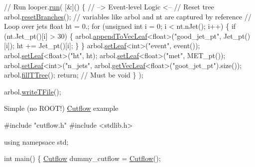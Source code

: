 \begin{DoxyEnumerate}
\begin{DoxyCode}
\textcolor{comment}{// Run}
looper.\hyperlink{classLooper_abfa564ca48778da1f58c8a6444ddd463}{run}(
    [&]()
    \{
        \textcolor{comment}{// --> Event-level Logic <--}
        \textcolor{comment}{// Reset tree}
        arbol.\hyperlink{classArbol_a4c2184d378ab21a9627a57098291a7c4}{resetBranches}(); \textcolor{comment}{// variables like arbol and nt are captured by reference}
        \textcolor{comment}{// Loop over jets}
        \textcolor{keywordtype}{float} ht = 0.;
        \textcolor{keywordflow}{for} (\textcolor{keywordtype}{unsigned} \textcolor{keywordtype}{int} i = 0; i < nt.nJet(); i++) 
        \{
            \textcolor{keywordflow}{if} (nt.Jet\_pt()[i] > 30)
            \{
                arbol.\hyperlink{classArbol_a811156c9134ca7e0015bbe2ab95434b0}{appendToVecLeaf}<\textcolor{keywordtype}{float}>(\textcolor{stringliteral}{"good\_jet\_pt"}, Jet\_pt()[i]);
                ht += Jet\_pt()[i];
            \}
        \}
        arbol.\hyperlink{classArbol_a7a8d3bec0bf5c00635a0b00fcd63cf01}{setLeaf}<\textcolor{keywordtype}{int}>(\textcolor{stringliteral}{"event"}, event());
        arbol.\hyperlink{classArbol_a7a8d3bec0bf5c00635a0b00fcd63cf01}{setLeaf}<\textcolor{keywordtype}{float}>(\textcolor{stringliteral}{"ht"}, ht);
        arbol.\hyperlink{classArbol_a7a8d3bec0bf5c00635a0b00fcd63cf01}{setLeaf}<\textcolor{keywordtype}{float}>(\textcolor{stringliteral}{"met"}, MET\_pt());
        arbol.\hyperlink{classArbol_a7a8d3bec0bf5c00635a0b00fcd63cf01}{setLeaf}<\textcolor{keywordtype}{int}>(\textcolor{stringliteral}{"n\_jets"}, arbol.\hyperlink{classArbol_a634be85d92f5f26403407952b10a29fd}{getVecLeaf}<\textcolor{keywordtype}{float}>(\textcolor{stringliteral}{"goot\_jet\_pt"}).size());
        arbol.\hyperlink{classArbol_a1d029dd97a0451281c774b578d93bcda}{fillTTree}();
        \textcolor{keywordflow}{return}; \textcolor{comment}{// Must be void}
    \}
);

arbol.\hyperlink{classArbol_ade7d835bbe383a70006e86785ae5672c}{writeTFile}();
\end{DoxyCode}

\item Simple (no R\+O\+O\+T!) \hyperlink{classCutflow}{Cutflow} example 
\begin{DoxyCode}
\textcolor{preprocessor}{#include "cutflow.h"}
\textcolor{preprocessor}{#include <stdlib.h>}

\textcolor{keyword}{using} namepsace std;

\textcolor{keywordtype}{int} main()
\{
    \hyperlink{classCutflow}{Cutflow} dummy\_cutflow = \hyperlink{classCutflow}{Cutflow}();


\end{DoxyCode}
\end{DoxyEnumerate}
